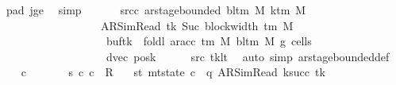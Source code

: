 \begin{isabellebody}
\ pad{}\ jge\ \isamarkupfalse%
\ simp\isanewline
\ \ \isamarkupfalse%
\isanewline
\ \ \isamarkupfalse%
\ src{\isacharunderscore}{\kern0pt}c{}{\isacharcolon}{\kern0pt}\ {\isachardoublequoteopen}ar{\isacharunderscore}{\kern0pt}stage{\isacharunderscore}{\kern0pt}bounded\ {\isacharparenleft}{\kern0pt}bl{\isacharunderscore}{\kern0pt}tm\ M{\isacharparenright}{\kern0pt}\ {\isacharparenleft}{\kern0pt}k{\isacharunderscore}{\kern0pt}tm\ M{\isacharparenright}{\kern0pt}\isanewline
\ \ \ \ \ \ \ \ \ \ \ \ \ \ \ \ \ \ {\isacharparenleft}{\kern0pt}AR{\isacharunderscore}{\kern0pt}SimRead{\isacharcomma}{\kern0pt}\ tk{\isacharcomma}{\kern0pt}\ Suc\ {\isacharparenleft}{\kern0pt}block{\isacharunderscore}{\kern0pt}width\ {\isacharparenleft}{\kern0pt}{\isasymGamma}{\isacharunderscore}{\kern0pt}tm\ M{\isacharparenright}{\kern0pt}{\isacharparenright}{\kern0pt}{\isacharcomma}{\kern0pt}\isanewline
\ \ \ \ \ \ \ \ \ \ \ \ \ \ \ \ \ \ \ buf{\isacharparenleft}{\kern0pt}tk\ {\isacharcolon}{\kern0pt}{\isacharequal}{\kern0pt}\ foldl\ {\isacharparenleft}{\kern0pt}ar{\isacharunderscore}{\kern0pt}acc\ {\isacharparenleft}{\kern0pt}{\isasymGamma}{\isacharunderscore}{\kern0pt}tm\ M{\isacharparenright}{\kern0pt}\ {\isacharparenleft}{\kern0pt}bl{\isacharunderscore}{\kern0pt}tm\ M{\isacharparenright}{\kern0pt}{\isacharparenright}{\kern0pt}\ {\isacharquery}{\kern0pt}g{}\ {\isacharquery}{\kern0pt}cells{}{\isacharparenright}{\kern0pt}{\isacharcomma}{\kern0pt}\isanewline
\ \ \ \ \ \ \ \ \ \ \ \ \ \ \ \ \ \ \ dvec{\isacharcomma}{\kern0pt}\ {\isacharquery}{\kern0pt}posk{\isacharprime}{\kern0pt}{\isacharparenright}{\kern0pt}{\isachardoublequoteclose}\isanewline
\ \ \ \ \isamarkupfalse%
\ src{}\ tk{\isacharunderscore}{\kern0pt}lt\ \isamarkupfalse%
\ {\isacharparenleft}{\kern0pt}auto\ simp{\isacharcolon}{\kern0pt}\ ar{\isacharunderscore}{\kern0pt}stage{\isacharunderscore}{\kern0pt}bounded{\isacharunderscore}{\kern0pt}def{\isacharparenright}{\kern0pt}\isanewline
\ \ \isamarkupfalse%
\ c{}\ \isanewline
\ \ \ \ \ \ s{}{\isacharcolon}{\kern0pt}\ {\isachardoublequoteopen}{\isacharparenleft}{\kern0pt}c{}{\isacharcomma}{\kern0pt}\ c{}{\isacharparenright}{\kern0pt}\ {\isasymin}\ R{\isacharprime}{\kern0pt}{\isachardoublequoteclose}\isanewline
\ \ \ st{}{\isacharcolon}{\kern0pt}\ {\isachardoublequoteopen}mt{\isacharunderscore}{\kern0pt}state\ c{}\ {\isacharequal}{\kern0pt}\ {\isacharparenleft}{\kern0pt}q{\isacharcomma}{\kern0pt}\ AR{\isacharunderscore}{\kern0pt}SimRead{\isacharcomma}{\kern0pt}\ k{\isacharunderscore}{\kern0pt}succ\ tk{\isacharcomma}{\kern0pt}\ {}{\isacharcomma}{\kern0pt}\isanewline

\end{isabellebody}
